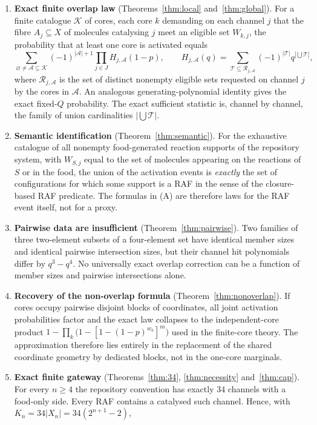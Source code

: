 \documentclass[11pt,a4paper]{article}
\theoremstyle{plain}
\theoremstyle{definition}
\theoremstyle{remark}
\newcommand{\cK}{\mathcal{K}}
\newcommand{\cR}{\mathcal{R}}
\newcommand{\cA}{\mathcal{A}}
\newcommand{\cT}{\mathcal{T}}
\begin{document}
\begin{enumerate}[label=\textbf{(\Alph*)},leftmargin=2.6em]
\item \textbf{Exact finite overlap law} (Theorems~\ref{thm:local} and~\ref{thm:global}). For a finite catalogue $\cK$ of cores, each core $k$ demanding on each channel $j$ that the fibre $A_j\subseteq X$ of molecules catalysing $j$ meet an eligible set $W_{k,j}$, the probability that at least one core is activated equals
\[
\sum_{\varnothing\neq\cA\subseteq\cK}(-1)^{|\cA|+1}\prod_{j\in J} H_{j,\cA}(1-p),
\qquad
H_{j,\cA}(q)=\sum_{\cT\subseteq\cR_{j,\cA}}(-1)^{|\cT|}q^{|\bigcup\cT|},
\]
where $\cR_{j,\cA}$ is the set of distinct nonempty eligible sets requested on channel $j$ by the cores in $\cA$. An analogous generating-polynomial identity gives the exact fixed-$Q$ probability. The exact sufficient statistic is, channel by channel, the family of union cardinalities $|\bigcup\cT|$.
\item \textbf{Semantic identification} (Theorem~\ref{thm:semantic}). For the exhaustive catalogue of all nonempty food-generated reaction supports of the repository system, with $W_{S,j}$ equal to the set of molecules appearing on the reactions of $S$ or in the food, the union of the activation events is \emph{exactly} the set of configurations for which some support is a RAF in the sense of the closure-based RAF predicate. The formulas in (A) are therefore laws for the RAF event itself, not for a proxy.
\item \textbf{Pairwise data are insufficient} (Theorem~\ref{thm:pairwise}). Two families of three two-element subsets of a four-element set have identical member sizes and identical pairwise intersection sizes, but their channel hit polynomials differ by $q^3-q^4$. No universally exact overlap correction can be a function of member sizes and pairwise intersections alone.
\item \textbf{Recovery of the non-overlap formula} (Theorem~\ref{thm:nonoverlap}). If cores occupy pairwise disjoint blocks of coordinates, all joint activation probabilities factor and the exact law collapses to the independent-core product $1-\prod_k\bigl(1-[1-(1-p)^{w_k}]^{m}\bigr)$ used in the finite-core theory. The approximation therefore lies entirely in the replacement of the shared coordinate geometry by dedicated blocks, not in the one-core marginals.
\item \textbf{Exact finite gateway} (Theorems~\ref{thm:34}, \ref{thm:necessity} and~\ref{thm:cap}). For every $n\ge 4$ the repository convention has exactly $34$ channels with a food-only side. Every RAF contains a catalysed such channel. Hence, with $K_n=34|X_n|=34(2^{n+1}-2)$,

\end{enumerate}
\end{document}
